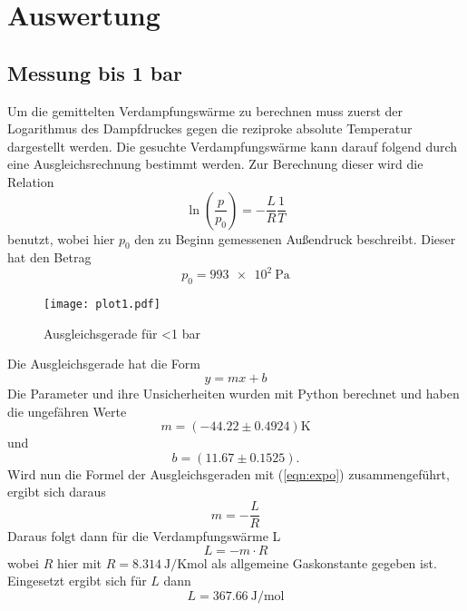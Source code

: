 \section{Auswertung}
\label{sec:Auswertung}


\subsection{Messung bis 1 bar}
Um die gemittelten Verdampfungswärme zu berechnen muss zuerst der Logarithmus des Dampfdruckes gegen die reziproke absolute Temperatur dargestellt werden. Die gesuchte
Verdampfungswärme kann darauf folgend durch eine Ausgleichsrechnung bestimmt werden. Zur Berechnung dieser wird die Relation
\begin{equation*}
  \label{eqn:druck3}
  \ln\left(\frac{p}{p_0}\right)=- \frac{L}{R} \frac{1}{T}
\end{equation*}
\newline
benutzt, wobei hier $p_0$ den zu Beginn gemessenen Außendruck beschreibt. Dieser hat den Betrag
\begin{equation*}
  p_0 = \SI{993e2}{\pascal}    %
\end{equation*}

\begin{figure}[H]
  \centering
  \texttt{[image: plot1.pdf]}
  \caption{Ausgleichsgerade für <1 bar}
  \label{fig:plot1}
\end{figure}
\noindent
Die Ausgleichsgerade hat die Form
\begin{equation*}
  y = mx + b
\end{equation*}
Die Parameter und ihre Unsicherheiten wurden mit Python berechnet und haben die ungefähren Werte
\begin{equation*}
  m = (-44.22\pm 0.4924) \si{\kelvin}
\end{equation*}
und
\begin{equation*}
  b = (11.67\pm 0.1525).
\end{equation*}
Wird nun die Formel der Ausgleichsgeraden mit (\ref{eqn:expo}) zusammengeführt, ergibt sich daraus
\begin{equation*}
  m=-\frac{L}{R}
\end{equation*}
Daraus folgt dann für die Verdampfungswärme L
\begin{equation*}
  L = - m \cdot R
\end{equation*}
wobei $R$ hier mit $R=\SI{8,314}{\joule\per\kelvin\mole}$ als allgemeine Gaskonstante gegeben ist.
Eingesetzt ergibt sich für $L$ dann
\begin{equation*}
  L = \SI{367,66}{\joule\per\mole}
\end{equation*}

